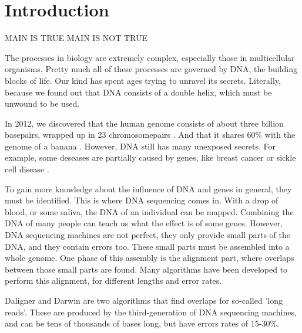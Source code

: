 \documentclass[../main/thesis.tex]{subfiles}
\begin{document}
\chapter{Introduction}
\ifdefined\main
\acresetall
MAIN IS TRUE
\else
MAIN IS NOT TRUE

\fi


The processes in biology are extremely complex, especially those in multicellular organisms.
Pretty much all of these processes are governed by DNA, the building blocks of life.
Our kind has spent ages trying to unravel its secrets.
Literally, because we found out that DNA consists of a double helix, which must be unwound to be used.

In 2012, we discovered that the human genome consists of about three billion basepairs, wrapped up in 23 chromosomepairs \cite{human_genome_project}.
And that it shares 60\% with the genome of a banana \cite{banana}.
However, DNA still has many unexposed secrets.
For example, some deseases are partially caused by genes, like breast cancer or sickle cell disease \cite{genomic_diseases}.

To gain more knowledge about the influence of DNA and genes in general, they must be identified.
This is where DNA sequencing comes in.
With a drop of blood, or some saliva, the DNA of an individual can be mapped.
Combining the DNA of many people can teach us what the effect is of some genes.
However, DNA sequencing machines are not perfect, they only provide small parts of the DNA, and they contain errors too.
These small parts must be assembled into a whole genome.
One phase of this assembly is the alignment part, where overlaps between those small parts are found.
Many algorithms have been developed to perform this alignment, for different lengths and error rates.

Daligner and Darwin are two algorithms that find overlaps for so-called 'long reads'.
These are produced by the third-generation of DNA sequencing machines, and can be tens of thousands of bases long, but have errors rates of 15-30\%.

\end{document}

